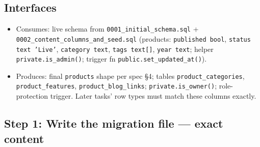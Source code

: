 \documentclass[11pt,a4paper]{article}
\begin{document}
\subsection*{Interfaces}
\begin{itemize}
  \item Consumes: live schema from \texttt{0001\_initial\_schema.sql} +
        \texttt{0002\_content\_columns\_and\_seed.sql} (products: \texttt{published bool},
        \texttt{status text 'Live'}, \texttt{category text}, \texttt{tags text[]},
        \texttt{year text}; helper \texttt{private.is\_admin()}; trigger fn
        \texttt{public.set\_updated\_at()}).
  \item Produces: final \texttt{products} shape per spec \S4; tables
        \texttt{product\_categories}, \texttt{product\_features}, \texttt{product\_blog\_links};
        \texttt{private.is\_owner()}; role-protection trigger. Later tasks' row types must
        match these columns exactly.
\end{itemize}

\subsection*{Step 1: Write the migration file --- exact content}
\end{document}

